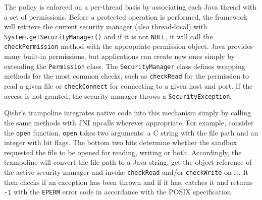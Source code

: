 \documentclass[a4paper,12pt,twoside,openright]{report}
\newcommand{\class}[1]{\texttt{#1}}
\begin{document}
The policy is enforced on a per-thread basis by associating each Java thread with a set of permissions. Before a protected operation is performed, the framework will retrieve the current security manager (also thread-local) with \texttt{System.{\allowbreak}getSecurityManager()} and if it is not \texttt{NULL}, it will call the \texttt{checkPermission} method with the appropriate permission object. Java provides many built-in permissions, but applications can create new ones simply by extending the \class{Permission} class. The \class{Security\-Manager} class defines wrapping methods for the most common checks, such as \texttt{checkRead} for the permission to read a given file or \texttt{checkConnect} for connecting to a given host and port. If the access is not granted, the security manager throws a \texttt{SecurityException}.

Qishr's trampoline integrates native code into this mechanism simply by calling the same methods with JNI upcalls wherever appropriate. For example, consider the \texttt{open} function. \texttt{open} takes two arguments: a C string with the file path and an integer with bit flags. The bottom two bits determine whether the sandbox requested the file to be opened for reading, writing or both. Accordingly, the trampoline will convert the file path to a Java string, get the object reference of the active security manager and invoke \texttt{checkRead} and/or \texttt{checkWrite} on it. It then checks if an exception has been thrown and if it has, catches it and returns \texttt{-1} with the \texttt{EPERM} error code in accordance with the POSIX specification. \label{sec:SyscallException}
\end{document}
